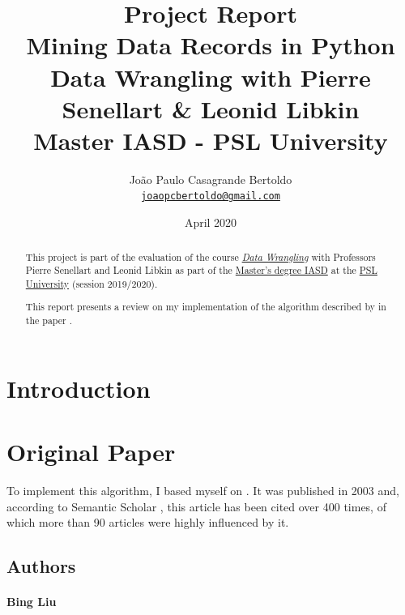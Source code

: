 \documentclass[11pt]{article}
\title{
    \huge Project Report \\ 
    Mining Data Records in Python \\ 
    \medskip
    \large Data Wrangling with Pierre Senellart \& Leonid Libkin  \\
    Master IASD - PSL University
}
\author{
    João Paulo Casagrande Bertoldo \\
    \href{mailto:joaopcbertoldo@gmail.com}{\texttt{joaopcbertoldo@gmail.com}} 
}
\date{April 2020}
\begin{document}




{
    \maketitle

    \begin{abstract}
    
    This project is part of the evaluation of the course \href{https://moodle.di.ens.fr/enrol/index.php?id=14}{\textit{Data Wrangling}} with Professors Pierre Senellart and Leonid Libkin as part of the \href{https://www.lamsade.dauphine.fr/wp/iasd/en/}{Master's degree IASD} at the \href{https://www.psl.eu/en}{PSL University} (session 2019/2020).
    \medskip
    
    This report presents a review on my implementation of the algorithm described by \cite{mdr} in the paper . 

    \end{abstract}
}

\tableofcontents
\newpage


\section{Introduction}


\section{Original Paper}

To implement this algorithm, I based myself on \cite{mdr-technical}. It was published in 2003 and, according to Semantic Scholar \citep{mdr-semantic-scholar}, this article has been cited over 400 times, of which more than 90 articles were highly influenced by it.

\subsection{Authors}

\paragraph{Bing Liu}
\end{document}
